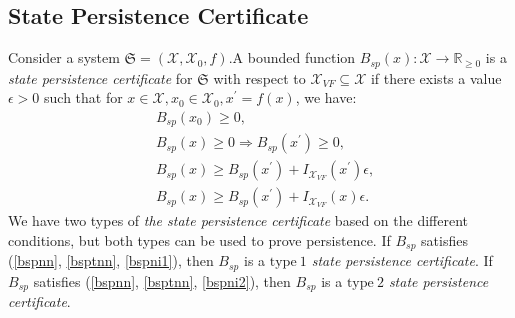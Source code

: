 \documentclass[acmlarge]{acmart}
\begin{document}

\subsection{State Persistence Certificate}

\begin{definition}
  \label{systempc}
  Consider a system $\mathfrak{S} = (\mathcal{X}, \mathcal{X}_0, f)$.A bounded function $B_{sp}(x): \mathcal{X} \rightarrow \mathbb{R}_{\geq 0}$ is a \emph{state persistence certificate} for $\mathfrak{S}$ with respect to $\mathcal{X}_{VF} \subseteq \mathcal{X}$ if there exists a value $\epsilon > 0$ such that for $x \in \mathcal{X}, x_0 \in \mathcal{X}_0, x^{\prime} = f(x)$, we have:\\
  \begin{align}
    &B_{sp}(x_0) \geq 0, \label{bspnn} \\
    &B_{sp}(x) \geq 0 \Rightarrow B_{sp}(x^{\prime}) \geq 0, \label{bsptnn} \\
    &B_{sp}(x) \geq B_{sp}(x^{\prime}) + I_{\mathcal{X}_{VF}}(x^{\prime})\epsilon, \label{bspni1}\\
    &B_{sp}(x) \geq B_{sp}(x^{\prime}) + I_{\mathcal{X}_{VF}}(x)\epsilon. \label{bspni2}
  \end{align}
  We have two types of \emph{the state persistence certificate} based on the different conditions, but both types can be used to prove persistence.
  If $B_{sp}$ satisfies (\ref{bspnn}, \ref{bsptnn}, \ref{bspni1}), then $B_{sp}$ is a \emph{$\mathrm{type~1}$ state persistence certificate}. If $B_{sp}$ satisfies (\ref{bspnn}, \ref{bsptnn}, \ref{bspni2}), then $B_{sp}$ is a \emph{$\mathrm{type~2}$ state persistence certificate}.
\end{definition}
\end{document}
